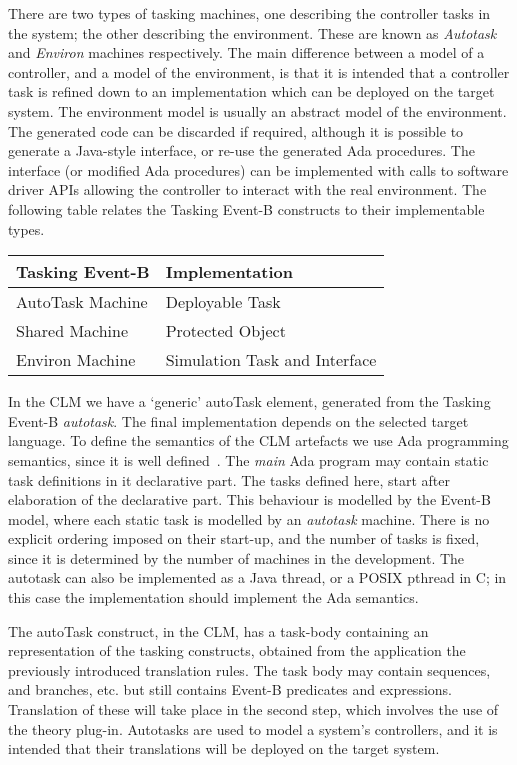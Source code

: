There are two types of tasking machines, one describing the controller tasks in the system; the other describing the environment. These are known as \emph{Autotask} and \emph{Environ} machines respectively. The main difference between a model of a controller, and a model of the environment, is that it is intended that a controller task is refined down to an implementation which can be deployed on the target system. The environment model is usually an abstract model of the environment. The generated code can be discarded if required, although it is possible to generate a Java-style interface, or re-use the generated Ada procedures. The interface (or modified Ada procedures) can be implemented with calls to software driver APIs allowing the controller to interact with the real environment. The following table relates the Tasking Event-B constructs to their implementable types.
%
\begin{center}
\begin{tabular}{l|l}
Tasking Event-B & Implementation \\ 
\hline
AutoTask Machine & Deployable Task\\
Shared Machine &	Protected Object\\
Environ Machine &	Simulation Task and Interface
\end{tabular}
\end{center}
%
In the CLM we have a `generic' autoTask element, generated from the Tasking Event-B \emph{autotask}. The final implementation depends on the selected target language. To define the semantics of the CLM artefacts we use Ada programming semantics, since it is well defined~\cite{ada2005}. The \emph{main} Ada program may contain static task definitions in it declarative part. The tasks defined here, start after elaboration of the declarative part. This behaviour is modelled by the Event-B model, where each static task is modelled by an \emph{autotask} machine. There is no explicit ordering imposed on their start-up, and  the number of tasks is fixed, since it is determined by the number of machines in the development. The autotask can also be implemented as a Java thread, or a POSIX pthread in C; in this case the implementation should implement the Ada semantics.

 The autoTask construct, in the CLM, has a task-body containing an representation of the tasking constructs, obtained from the application the previously introduced translation rules. The task body may contain sequences, and branches, etc. but still contains Event-B predicates and expressions. Translation of these will take place in the second step, which involves the use of the theory plug-in. Autotasks are used to model a system's controllers, and it is intended that their translations will be deployed on the target system.

